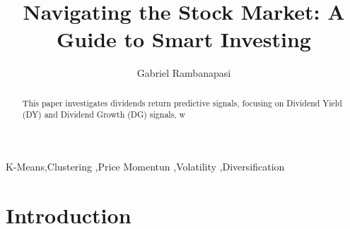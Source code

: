 \documentclass[11pt,preprint, authoryear]{elsarticle}
\numberwithin{equation}{section}
\numberwithin{figure}{section}
\numberwithin{table}{section}
\begin{document}
\begin{frontmatter}  %

\title{Navigating the Stock Market: A Guide to Smart Investing}





\author[Add1]{Gabriel Rambanapasi}





\address[Add1]{Stellenbosch University, Stellenbosch, South Africa}


\begin{abstract}
\small{
This paper investigates dividends return predictive signals, focusing on
Dividend Yield (DY) and Dividend Growth (DG) signals, w
}
\end{abstract}

\vspace{1cm}


\begin{keyword}
\footnotesize{
K-Means\sep Clustering \sep Price Momentun \sep Volatility
\sep Diversification \\
\vspace{0.3cm}
}
\end{keyword}



\vspace{0.5cm}

\end{frontmatter}

\setcounter{footnote}{0}



\pagestyle{fancy}
\chead{}
\rhead{}
\lfoot{}
\lhead{}
\cfoot{}


\headsep 35pt %




\hypertarget{introduction}{%
\section{Introduction}\label{introduction}}
\end{document}
